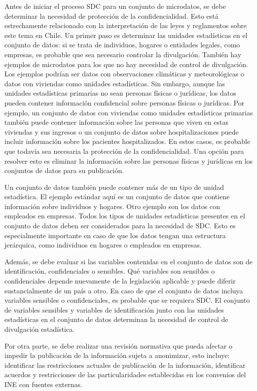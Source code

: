 \documentclass[
]{book}
\theoremstyle{definition}
\theoremstyle{definition}
\theoremstyle{definition}
\theoremstyle{definition}
\theoremstyle{remark}
\begin{document}
Antes de iniciar el proceso SDC para un conjunto de microdatos, se debe determinar la necesidad de protección de la confidencialidad. Esto está estrechamente relacionado con la interpretación de las leyes y reglamentos sobre este tema en Chile. Un primer paso es determinar las unidades estadísticas en el conjunto de datos: si se trata de individuos, hogares o entidades legales, como empresas, es probable que sea necesario controlar la divulgación. También hay ejemplos de microdatos para los que no hay necesidad de control de divulgación. Los ejemplos podrían ser datos con observaciones climáticas y meteorológicas o datos con viviendas como unidades estadísticas. Sin embargo, aunque las unidades estadísticas primarias no sean personas físicas o jurídicas, los datos pueden contener información confidencial sobre personas físicas o jurídicas. Por ejemplo, un conjunto de datos con viviendas como unidades estadísticas primarias también puede contener información sobre las personas que viven en estas viviendas y sus ingresos o un conjunto de datos sobre hospitalizaciones puede incluir información sobre los pacientes hospitalizados. En estos casos, es probable que todavía sea necesaria la protección de la confidencialidad. Una opción para resolver esto es eliminar la información sobre las personas físicas y jurídicas en los conjuntos de datos para su publicación.

Un conjunto de datos también puede contener más de un tipo de unidad estadística. El ejemplo estándar aquí es un conjunto de datos que contiene información sobre individuos y hogares. Otro ejemplo son los datos con empleados en empresas. Todos los tipos de unidades estadísticas presentes en el conjunto de datos deben ser considerados para la necesidad de SDC. Esto es especialmente importante en caso de que los datos tengan una estructura jerárquica, como individuos en hogares o empleados en empresas.

Además, se debe evaluar si las variables contenidas en el conjunto de datos son de identificación, confidenciales o sensibles. Qué variables son sensibles o confidenciales depende nuevamente de la legislación aplicable y puede diferir sustancialmente de un país a otro. En caso de que el conjunto de datos incluya variables sensibles o confidenciales, es probable que se requiera SDC. El conjunto de variables sensibles y variables de identificación junto con las unidades estadísticas en el conjunto de datos determinan la necesidad de control de divulgación estadística.

Por otra parte, se debe realizar una revisión normativa que pueda afectar o impedir la publicación de la información sujeta a anonimizar, esto incluye: identificar las restricciones actuales de publicación de la información, identificar acuerdos y restricciones de las particularidades establecidas en los convenios del INE con fuentes externas.
\end{document}
